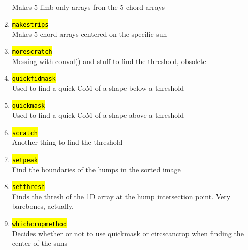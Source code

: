 \documentclass[10pt]{article}
\begin{document}
\begin{enumerate}
		Makes 5 limb-only arrays fron the 5 chord arrays
	\item \hl{\texttt{makestrips}}\\
		Makes 5 chord arrays centered on the specific sun
	\item \hl{\texttt{morescratch}}\\
		Messing with convol() and stuff to find the threshold, obsolete
	\item \hl{\texttt{quickfidmask}}\\
		Used to find a quick CoM of a shape below a threshold
	\item \hl{\texttt{quickmask}}\\
		Used to find a quick CoM of a shape above a threshold
	\item \hl{\texttt{scratch}}\\
		Another thing to find the threshold
	\item \hl{\texttt{setpeak}}\\
		Find the boundaries of the humps in the sorted image 
	\item \hl{\texttt{setthresh}}\\
		Finds the thresh of the 1D array at the hump intersection point. Very barebones, actually.
	\item \hl{\texttt{whichcropmethod}}\\
		Decides whether or not to use quickmask or circscancrop when finding the center of the suns
\end{enumerate}


\end{document}
